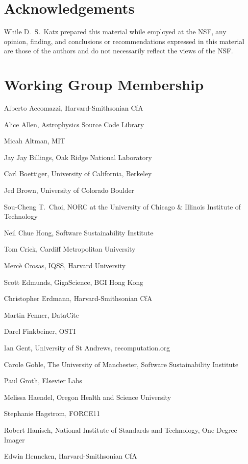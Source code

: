 \documentclass[12pt, oneside]{amsart}
\begin{document}
\section*{Acknowledgements}

While D.~S.~Katz prepared this material while employed at the NSF, any opinion, finding, and conclusions or recommendations expressed in this material are those of the authors and do not necessarily reflect the views of the NSF.

\appendix

\section{Working Group Membership}
\label{app:wg_members}

Alberto Accomazzi, Harvard-Smithsonian CfA

Alice Allen, Astrophysics Source Code Library

Micah Altman, MIT

Jay Jay Billings, Oak Ridge National Laboratory

Carl Boettiger, University of California,  Berkeley

Jed Brown, University of Colorado Boulder

Sou-Cheng T.~Choi, NORC at the University of Chicago \& Illinois Institute of Technology

Neil Chue Hong, Software Sustainability Institute

Tom Crick, Cardiff Metropolitan University

Merc\`e Crosas, IQSS, Harvard University

Scott Edmunds, GigaScience, BGI Hong Kong

Christopher Erdmann, Harvard-Smithsonian CfA

Martin Fenner, DataCite

Darel Finkbeiner, OSTI

Ian Gent, University of St Andrews, recomputation.org

Carole Goble, The University of Manchester, Software Sustainability Institute

Paul Groth, Elsevier Labs

Melissa Haendel, Oregon Health and Science University

Stephanie Hagstrom, FORCE11

Robert Hanisch, National Institute of Standards and Technology, One Degree Imager

Edwin Henneken, Harvard-Smithsonian CfA
\end{document}
